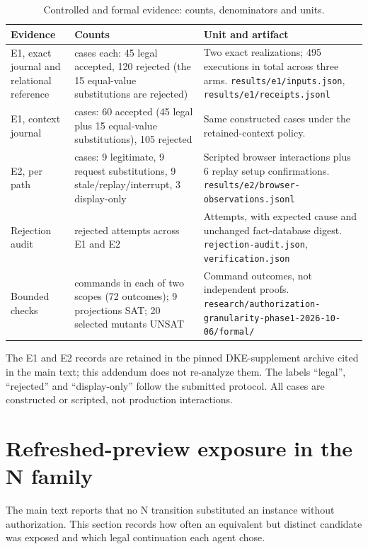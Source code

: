\documentclass[10pt,a4paper]{article}
\begin{document}
\begin{table}[htbp]
\centering\small
\caption{Controlled and formal evidence: counts, denominators and units.}
\begin{tabularx}{\textwidth}{@{}l>{\raggedright\arraybackslash}p{}X@{}}
\toprule
Evidence & Counts & Unit and artifact \\
\midrule
E1, exact journal and relational reference & 165 cases each: 45 legal accepted, 120 rejected (the 15 equal-value substitutions are rejected) & Two exact realizations; 495 executions in total across three arms. \nolinkurl{results/e1/inputs.json}, \nolinkurl{results/e1/receipts.jsonl} \\
E1, context journal & 165 cases: 60 accepted (45 legal plus 15 equal-value substitutions), 105 rejected & Same constructed cases under the retained-context policy. \\
E2, per path & 30 cases: 9 legitimate, 9 request substitutions, 9 stale/replay/interrupt, 3 display-only & Scripted browser interactions plus 6 replay setup confirmations. \nolinkurl{results/e2/browser-observations.jsonl} \\
Rejection audit & 372 rejected attempts across E1 and E2 & Attempts, with expected cause and unchanged fact-database digest. \nolinkurl{rejection-audit.json}, \nolinkurl{verification.json} \\
Bounded checks & 36 commands in each of two scopes (72 outcomes); 9 projections SAT; 20 selected mutants UNSAT & Command outcomes, not independent proofs. \nolinkurl{research/authorization-granularity-phase1-2026-10-06/formal/} \\
\bottomrule
\end{tabularx}
\end{table}

The E1 and E2 records are retained in the pinned DKE-supplement archive cited in the main text; this addendum does not re-analyze them. The labels ``legal'', ``rejected'' and ``display-only'' follow the submitted protocol. All cases are constructed or scripted, not production interactions.

\section{Refreshed-preview exposure in the N family}
The main text reports that no N transition substituted an instance without authorization. This section records how often an equivalent but distinct candidate was exposed and which legal continuation each agent chose.
\end{document}
